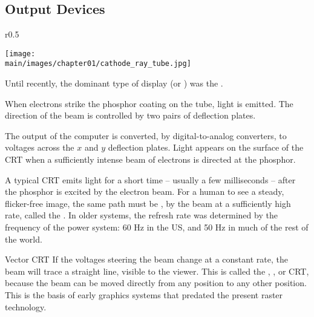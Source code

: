 \documentclass[\main/notes.tex]{subfiles}
\begin{document}
      \subsection{Output Devices}
        \begin{wrapfigure}{r}{0.5\textwidth}
          \begin{center}
            \texttt{[image: \\main/images/chapter01/cathode\_ray\_tube.jpg]}
          \end{center}
          \caption{Cathode-Ray Tube (CRT)}
        \end{wrapfigure}

        Until recently, the dominant type of display (or ) was the
        .

        When electrons strike the phosphor coating on the tube, light is emitted.
        The direction of the beam is controlled by two pairs of deflection plates.

        The output of the computer is converted, by digital-to-analog converters,
        to voltages across the $x$ and $y$ deflection plates.
        Light appears on the surface of the CRT when a sufficiently intense beam of electrons
        is directed at the phosphor.

        A typical CRT emits light for a short time -- usually a few milliseconds
        -- after the phosphor is excited by the electron beam.
        For a human to see a steady, flicker-free image, the same path must be ,
        by the beam at a sufficiently high rate, called the .
        In older systems, the refresh rate was determined by the frequency of the power system:
        60 Hz in the US, and 50 Hz in much of the rest of the world.

        \begin{definition}{Vector CRT}
          If the voltages steering the beam change at a constant rate,
          the beam will trace a straight line, visible to the viewer.
          This is called the \mbox{}, ,
          or  CRT,
          because the beam can be moved directly from any position to any other position.
          This is the basis of early graphics systems that predated the present raster technology.
        \end{definition}
\end{document}

